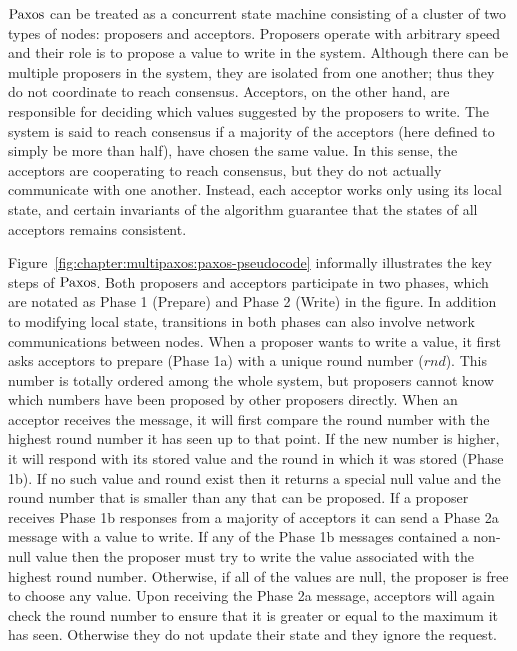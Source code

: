 $\mathrm{Paxos}$ can be treated as a concurrent state machine consisting of a cluster of two types of nodes: proposers and acceptors.
Proposers operate with arbitrary speed and their role is to propose a value to write in the system.
Although there can be multiple proposers in the system, they are isolated from one another;
thus they do not coordinate to reach consensus.
Acceptors, on the other hand, are responsible for deciding which values suggested by the proposers to write.
The system is said to reach consensus if a majority of the acceptors (here defined to simply be more than half), have chosen the same value.
In this sense, the acceptors are cooperating to reach consensus, but they do not actually communicate with one another.
Instead, each acceptor works only using its local state, and certain invariants of the algorithm guarantee that the states of all acceptors remains consistent.

Figure~\ref{fig:chapter:multipaxos:paxos-pseudocode} informally illustrates the key steps of $\mathrm{Paxos}$.
Both proposers and acceptors participate in two phases, which are notated as Phase 1 (Prepare) and Phase 2 (Write) in the figure.
In addition to modifying local state, transitions in both phases can also involve network communications between nodes.
When a proposer wants to write a value, it first asks acceptors to prepare (Phase 1a) with a unique round number ($rnd$).
This number is totally ordered among the whole system, but proposers cannot know which numbers have been proposed by other proposers directly.
When an acceptor receives the message, it will first compare the round number with the highest round number it has seen up to that point.
If the new number is higher, it will respond with its stored value and the round in which it was stored (Phase 1b).
If no such value and round exist then it returns a special null value and the round number that is smaller than any that can be proposed.
If a proposer receives Phase 1b responses from a majority of acceptors it can send a Phase 2a message with a value to write.
If any of the Phase 1b messages contained a non-null value then the proposer must try to write the value associated with the highest round number.
Otherwise, if all of the values are null, the proposer is free to choose any value.
Upon receiving the Phase 2a message, acceptors will again check the round number to ensure that it is greater or equal to the maximum it has seen.
Otherwise they do not update their state and they ignore the request.


